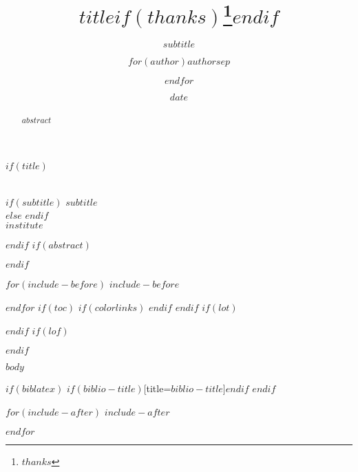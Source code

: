 \documentclass[11pt, article, oneside]{memoir}
\title{$title$$if(thanks)$\thanks{$thanks$}$endif$}
\subtitle{$subtitle$}
\author{$for(author)$$author$$sep$ \and $endfor$}
\date{$date$}
\makeatletter
\renewcommand\headrulewidth{0.4pt}
\renewcommand{\maketitle}{\bgroup\setlength{\parindent}{0pt}
\thispagestyle{empty}
\begin{flushleft}
  \vspace*{0.75in}
  \huge\textbf{\@title} \\
  $if(subtitle)$
  \smallskip
  \Large\textbf{$subtitle$} \\
  \vspace{0.25in}
  $else$
  \vspace{0.25in}
  $endif$
  \Large\@author \\
  \smallskip
  \Large\emph{$institute$}
  \vspace{0.5in}
\end{flushleft}\egroup
}
\makeatother
\begin{document}
\pagestyle{fancy}
\lhead{}
\chead{}
\lfoot{}
\cfoot{}
\rfoot{}
\renewcommand{\headrulewidth}{0.4pt}
\renewcommand{\footrulewidth}{0pt}

$if(title)$
\maketitle
$endif$
$if(abstract)$
\begin{abstract}
$abstract$
\end{abstract}
$endif$

$for(include-before)$
$include-before$

$endfor$
$if(toc)$
{
$if(colorlinks)$
\hypersetup{linkcolor=$if(toccolor)$$toccolor$$else$black$endif$}
$endif$
\setcounter{tocdepth}{$toc-depth$}
\tableofcontents
}
$endif$
$if(lot)$
\listoftables
$endif$
$if(lof)$
\listoffigures
$endif$

$body$

$if(biblatex)$
\printbibliography$if(biblio-title)$[title=$biblio-title$]$endif$
$endif$

$for(include-after)$
$include-after$

$endfor$
\thispagestyle{git}
\end{document}
